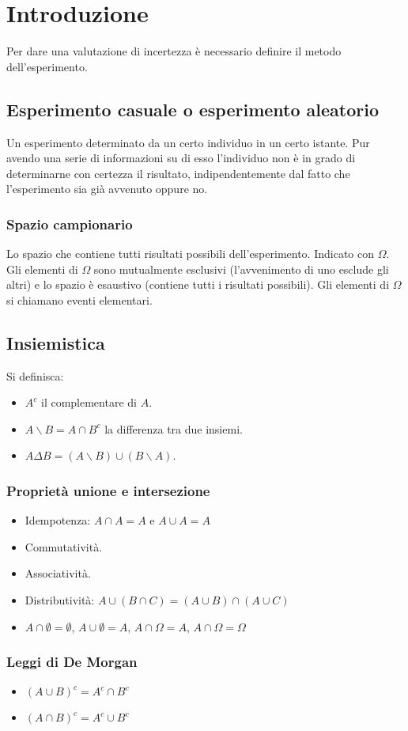 \chapter{Introduzione}
Per dare una valutazione di incertezza \`e necessario definire il metodo dell'esperimento.
\section{Esperimento casuale o esperimento aleatorio}
Un esperimento determinato da un certo individuo in un certo istante. Pur avendo una serie di informazioni su di esso l'individuo non \`e in grado di determinarne con certezza
il risultato, indipendentemente dal fatto che l'esperimento sia gi\`a avvenuto oppure no.
\subsection{Spazio campionario}
Lo spazio che contiene tutti risultati possibili dell'esperimento. Indicato con $\Omega$. Gli elementi di $\Omega$ sono mutualmente esclusivi (l'avvenimento di uno esclude gli altri) e 
lo spazio \`e esaustivo (contiene tutti i risultati possibili). Gli elementi di $\Omega$ si chiamano eventi elementari. 
\section{Insiemistica}
Si definisca:
\begin{itemize}
\item $A^c$ il complementare di $A$.
\item $A\backslash B=A\cap B^c$ la differenza tra due insiemi.
\item $A\Delta B=(A\backslash B)\cup(B\backslash A)$.
\end{itemize}
\subsection{Propriet\`a unione e intersezione}
\begin{itemize}
\item Idempotenza: $A\cap A=A$ e $A\cup A=A$
\item Commutativit\`a.
\item Associativit\`a. 
\item Distributivit\`a: $A\cup(B\cap C)=(A\cup B)\cap(A\cup C)$
\item $A\cap\emptyset=\emptyset$, $A\cup\emptyset=A$, $A\cap\Omega=A$, $A\cap\Omega=\Omega$
\end{itemize}
\subsection{Leggi di De Morgan} 
\begin{itemize}
\item $(A\cup B)^c=A^c\cap B^c$
\item $(A\cap B)^c=A^c\cup B^c$
\end{itemize}
